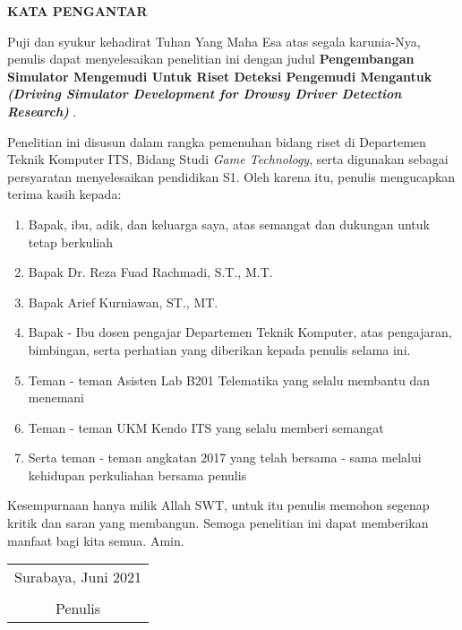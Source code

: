 \begin{center}
\Large\textbf{KATA PENGANTAR}
\end{center}
\vspace{1ex}

\setlength{\parindent}{0.9cm} Puji dan syukur kehadirat Tuhan Yang Maha Esa atas segala karunia-Nya, penulis  dapat menyelesaikan penelitian ini dengan judul \textbf{Pengembangan Simulator Mengemudi Untuk Riset Deteksi Pengemudi Mengantuk \textit{(Driving Simulator Development for Drowsy Driver Detection Research)}
}.
\vspace{1ex}

Penelitian ini disusun dalam rangka pemenuhan bidang riset di Departemen Teknik Komputer ITS, Bidang  Studi \textit{Game Technology}, serta digunakan sebagai persyaratan menyelesaikan pendidikan  S1. Oleh karena itu, penulis mengucapkan terima kasih kepada:
\vspace{1ex}

\begin{enumerate}[nolistsep]
  \item Bapak, ibu, adik, dan keluarga saya, atas semangat dan dukungan untuk tetap berkuliah
  \item Bapak Dr. Reza Fuad Rachmadi, S.T., M.T.
  \item Bapak Arief Kurniawan, ST., MT.
  \item Bapak - Ibu dosen pengajar Departemen Teknik Komputer, atas pengajaran, bimbingan, serta perhatian yang diberikan kepada penulis selama ini.
  \item Teman - teman Asisten Lab B201 Telematika yang selalu membantu dan menemani
  \item Teman - teman UKM Kendo ITS yang selalu memberi semangat
  \item Serta teman - teman angkatan 2017 yang telah bersama - sama melalui kehidupan perkuliahan bersama penulis
\end{enumerate}
\vspace{1ex}

Kesempurnaan hanya milik Allah SWT, untuk itu penulis memohon segenap kritik dan saran yang  membangun. Semoga penelitian ini dapat memberikan manfaat bagi kita semua. Amin.
\begin{flushright}
\begin{tabular}[b]{c}
  Surabaya, Juni 2021
  \\
  \\
  Penulis
\end{tabular}
\end{flushright}